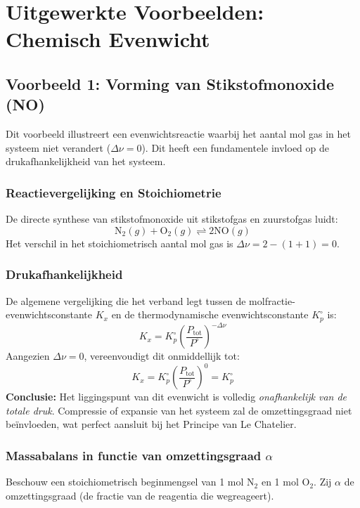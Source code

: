 \documentclass[11pt,a4paper]{article}
\begin{document}
\section{Uitgewerkte Voorbeelden: Chemisch Evenwicht}

\subsection{Voorbeeld 1: Vorming van Stikstofmonoxide (NO)}

Dit voorbeeld illustreert een evenwichtsreactie waarbij het aantal mol gas in het systeem niet verandert ($\Delta \nu = 0$). Dit heeft een fundamentele invloed op de drukafhankelijkheid van het systeem.

\subsubsection{ Reactievergelijking en Stoichiometrie}
De directe synthese van stikstofmonoxide uit stikstofgas en zuurstofgas luidt:
\begin{equation}
    \text{N}_2(g) + \text{O}_2(g) \rightleftharpoons 2\text{NO}(g)
\end{equation}
Het verschil in het stoichiometrisch aantal mol gas is $\Delta \nu = 2 - (1 + 1) = 0$.

\subsubsection{ Drukafhankelijkheid}
De algemene vergelijking die het verband legt tussen de molfractie-evenwichtsconstante $K_x$ en de thermodynamische evenwichtsconstante $K_p^\circ$ is:
\begin{equation}
    K_x = K_p^\circ \left( \frac{P_{\text{tot}}}{P^\circ} \right)^{-\Delta \nu}
\end{equation}
Aangezien $\Delta \nu = 0$, vereenvoudigt dit onmiddellijk tot:
\begin{equation}
    K_x = K_p^\circ \left( \frac{P_{\text{tot}}}{P^\circ} \right)^{0} = K_p^\circ
\end{equation}
\textbf{Conclusie:} Het liggingspunt van dit evenwicht is volledig \textit{onafhankelijk van de totale druk}. Compressie of expansie van het systeem zal de omzettingsgraad niet beïnvloeden, wat perfect aansluit bij het Principe van Le Chatelier.

\subsubsection{ Massabalans in functie van omzettingsgraad $\alpha$}
Beschouw een stoichiometrisch beginmengsel van 1 mol $\text{N}_2$ en 1 mol $\text{O}_2$. Zij $\alpha$ de omzettingsgraad (de fractie van de reagentia die wegreageert).
\end{document}
